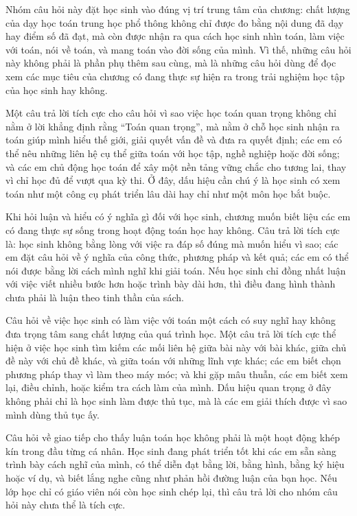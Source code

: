 \documentclass[
  10pt,
  a4paper,
  landscape,
  twoside,
  openany
]{scrbook}
\newcommand{\NOTE}[1]{#1}
\begin{document}
{
\NOTE{Nhóm câu hỏi này đặt học sinh vào đúng vị trí trung tâm của chương: chất lượng của dạy học toán trung học phổ thông không chỉ được đo bằng nội dung đã dạy hay điểm số đã đạt, mà còn được nhận ra qua cách học sinh nhìn toán, làm việc với toán, nói về toán, và mang toán vào đời sống của mình. Vì thế, những câu hỏi này không phải là phần phụ thêm sau cùng, mà là những câu hỏi dùng để đọc xem các mục tiêu của chương có đang thực sự hiện ra trong trải nghiệm học tập của học sinh hay không.

Một câu trả lời tích cực cho câu hỏi vì sao việc học toán quan trọng không chỉ nằm ở lời khẳng định rằng “Toán quan trọng”, mà nằm ở chỗ học sinh nhận ra toán giúp mình hiểu thế giới, giải quyết vấn đề và đưa ra quyết định; các em có thể nêu những liên hệ cụ thể giữa toán với học tập, nghề nghiệp hoặc đời sống; và các em chủ động học toán để xây một nền tảng vững chắc cho tương lai, thay vì chỉ học đủ để vượt qua kỳ thi. Ở đây, dấu hiệu cần chú ý là học sinh có xem toán như một công cụ phát triển lâu dài hay chỉ như một môn học bắt buộc.

Khi hỏi luận và hiểu có ý nghĩa gì đối với học sinh, chương muốn biết liệu các em có đang thực sự sống trong hoạt động toán học hay không. Câu trả lời tích cực là: học sinh không bằng lòng với việc ra đáp số đúng mà muốn hiểu vì sao; các em đặt câu hỏi về ý nghĩa của công thức, phương pháp và kết quả; các em có thể nói được bằng lời cách mình nghĩ khi giải toán. Nếu học sinh chỉ đồng nhất luận với việc viết nhiều bước hơn hoặc trình bày dài hơn, thì điều đang hình thành chưa phải là luận theo tinh thần của sách.

Câu hỏi về việc học sinh có làm việc với toán một cách có suy nghĩ hay không đưa trọng tâm sang chất lượng của quá trình học. Một câu trả lời tích cực thể hiện ở việc học sinh tìm kiếm các mối liên hệ giữa bài này với bài khác, giữa chủ đề này với chủ đề khác, và giữa toán với những lĩnh vực khác; các em biết chọn phương pháp thay vì làm theo máy móc; và khi gặp mâu thuẫn, các em biết xem lại, điều chỉnh, hoặc kiểm tra cách làm của mình. Dấu hiệu quan trọng ở đây không phải chỉ là học sinh làm được thủ tục, mà là các em giải thích được vì sao mình dùng thủ tục ấy.

Câu hỏi về giao tiếp cho thấy luận toán học không phải là một hoạt động khép kín trong đầu từng cá nhân. Học sinh đang phát triển tốt khi các em sẵn sàng trình bày cách nghĩ của mình, có thể diễn đạt bằng lời, bằng hình, bằng ký hiệu hoặc ví dụ, và biết lắng nghe cũng như phản hồi đường luận của bạn học. Nếu lớp học chỉ có giáo viên nói còn học sinh chép lại, thì câu trả lời cho nhóm câu hỏi này chưa thể là tích cực.

}}
\end{document}

